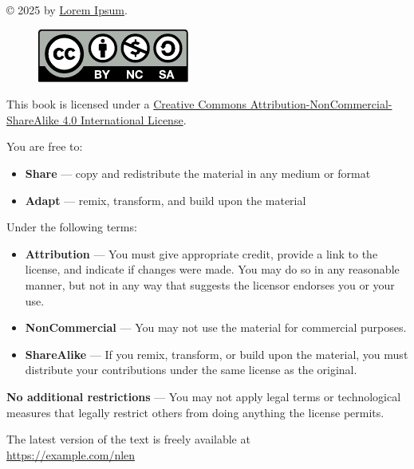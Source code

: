 \thispagestyle{empty}

\vfill

\begin{flushleft}
© 2025 by \href{https://example.com}{Lorem Ipsum}.
\vspace{10mm}
\begin{figure}[h]
\includegraphics{../../resources/licensing/by-nc-sa.pdf}
\end{figure}

This book is licensed under a
\href{http://creativecommons.org/licenses/by-nc-sa/4.0/}{Creative
Commons Attribution-NonCommercial-ShareAlike 4.0 International
License}.
\end{flushleft}

\begin{flushleft}
You are free to:
\end{flushleft}
\begin{itemize}[noitemsep,topsep=-16pt]
\tightlist
\item
\textbf{Share} --- copy and redistribute the material in any medium
or format
\item
\textbf{Adapt} --- remix, transform, and build upon the material
\end{itemize}

\begin{flushleft}
Under the following terms:
\end{flushleft}
\begin{itemize}[noitemsep,topsep=-16pt]
\tightlist
\item
\textbf{Attribution} --- You must give appropriate credit, provide a
link to the license, and indicate if changes were made. You may do so
in any reasonable manner, but not in any way that suggests the
licensor endorses you or your use.
\item
\textbf{NonCommercial} --- You may not use the material for commercial
purposes.
\item
\textbf{ShareAlike} --- If you remix, transform, or build upon the material,
you must distribute your contributions under the same license as the original.
\end{itemize}
\begin{flushleft}
\textbf{No additional restrictions} --- You may not apply legal terms
or technological measures that legally restrict others from doing
anything the license permits.
\end{flushleft}
\vspace{10mm}
{\centering
    The latest version of the text is freely available at\\\href{https://example.com/nlen}{https://example.com/nlen}
\par}
\pagebreak

